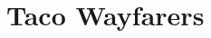 \documentclass[class=myArticleClass, float=false, crop=false]{standalone}
\begin{document}
\section{Taco Wayfarers}
\label{sTW}
\end{document}

